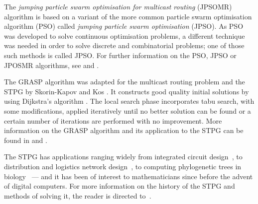 \documentclass[journal]{IEEEtran}
\begin{document}
The \emph{jumping particle swarm optimisation for multicast routing} (JPSOMR) algorithm is based on a variant of the more common particle swarm optimisation algorithm (PSO) called \emph{jumping particle swarm optimisation} (JPSO). As PSO was developed to solve continuous optimisation problems, a different technique was needed in order to solve discrete and combinatorial problems; one of those such methods is called JPSO. For further information on the PSO, JPSO or JPOSMR algorithms, see \cite{pso:kennedy, jpso:consoli} and \cite{jpsomr:qu}.

The GRASP algorithm was adapted for the multicast routing problem and the STPG by Skorin-Kapov and Kos \cite{grasp:skorin}. It constructs good quality initial solutions by using Dijkstra's algorithm \cite{dijk:dijkstra}. The local search phase incorporates tabu search, with some modifications, applied iteratively until no better solution can be found or a certain number of iterations are performed with no improvement. More information on the GRASP algorithm and its application to the STPG can be found in \cite{grasp:feo, grasp:skorin} and \cite{grasp:martins}.


The STPG has applications ranging widely from integrated circuit design~\cite{vlsi:cho}, to distribution and logistics network design~\cite{stpg-logistics}, to computing phylogenetic trees in biology~\cite{phylo} --- and it has been of interest to mathematicians since before the advent of digital computers. For more information on the history of the STPG and methods of solving it, the reader is directed to~\cite{history:brazil,steiner:hwang,steinerbook,steineradvance}. 

\end{document}
